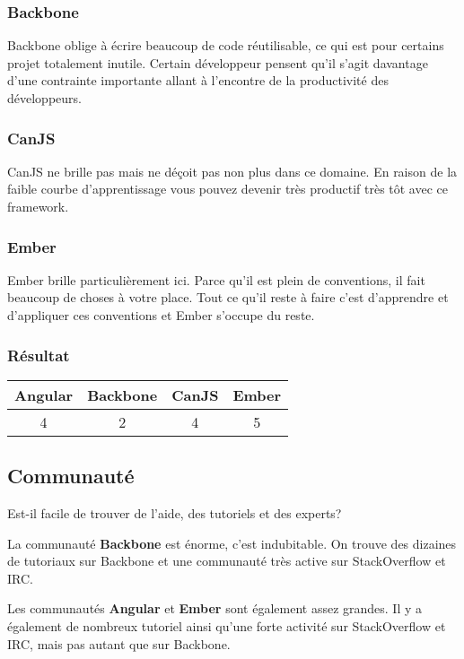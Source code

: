 \subsubsection{Backbone}


Backbone oblige à écrire beaucoup de code réutilisable, ce qui est pour certains projet totalement inutile. Certain développeur pensent qu'il s'agit davantage d'une contrainte importante allant à l’encontre de la productivité des développeurs.

\subsubsection{CanJS}

CanJS ne brille pas mais ne déçoit pas non plus dans ce domaine. En raison de la faible courbe d’apprentissage vous pouvez devenir très productif très tôt avec ce framework.


\subsubsection{Ember}

Ember brille particulièrement ici. Parce qu’il est plein de conventions, il fait beaucoup de choses à votre place. Tout ce qu’il reste à faire c'est d’apprendre et d'appliquer ces conventions et Ember s’occupe du reste.




\subsubsection{Résultat}
\begin{tabular}{|c|c|c|c|}
  \hline 
  Angular & Backbone & CanJS & Ember \\
  \hline 
  4 & 2 & 4 & 5 \\
  \hline
\end{tabular}

\subsection{Communauté}

Est-il facile de trouver de l’aide, des tutoriels et des experts?

La communauté \textbf{Backbone} est énorme, c'est indubitable. On trouve des dizaines de tutoriaux sur Backbone et une communauté très active sur StackOverflow et IRC.

Les communautés \textbf{Angular} et \textbf{Ember} sont également assez grandes. Il y a également de nombreux tutoriel ainsi qu'une forte activité sur StackOverflow et IRC, mais pas autant que sur Backbone.

